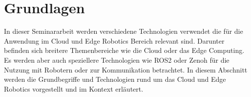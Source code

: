\section{Grundlagen}
\label{sec:grundlagen}

In dieser Seminararbeit werden verschiedene Technologien verwendet die für die Anwendung im Cloud und Edge Robotics Bereich relevant sind. Darunter befinden sich breitere Themenbereiche wie die Cloud oder das Edge Computing. Es werden aber auch speziellere Technologien wie ROS2 oder Zenoh für die Nutzung mit Robotern oder zur Kommunikation betrachtet. In diesem Abschnitt werden die Grundbegriffe und Technologien rund um das Cloud und Edge Robotics vorgestellt und im Kontext erläutert.









